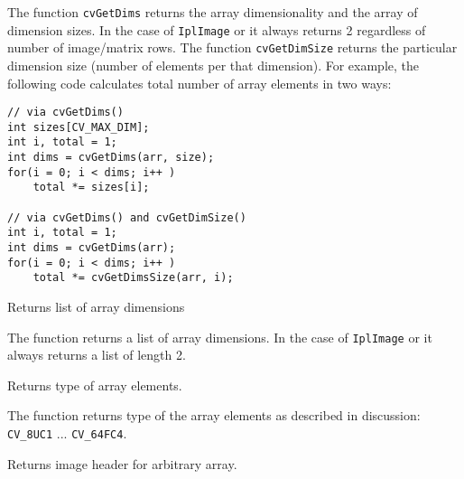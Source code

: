 The function \texttt{cvGetDims} returns the array dimensionality and the
array of dimension sizes. In the case of \texttt{IplImage} or  it always
returns 2 regardless of number of image/matrix rows. The function
\texttt{cvGetDimSize} returns the particular dimension size (number of
elements per that dimension). For example, the following code calculates
total number of array elements in two ways:

\begin{lstlisting}
// via cvGetDims()
int sizes[CV_MAX_DIM];
int i, total = 1;
int dims = cvGetDims(arr, size);
for(i = 0; i < dims; i++ )
    total *= sizes[i];

// via cvGetDims() and cvGetDimSize()
int i, total = 1;
int dims = cvGetDims(arr);
for(i = 0; i < dims; i++ )
    total *= cvGetDimsSize(arr, i);
\end{lstlisting}
\fi

\ifPy
{}
Returns list of array dimensions


\begin{description}
\end{description}

The function returns a list of array dimensions.
In the case of \texttt{IplImage} or  it always
returns a list of length 2.
\fi


Returns type of array elements.


\begin{description}
\end{description}

The function returns type of the array elements
as described in  discussion: \texttt{CV\_8UC1} ... \texttt{CV\_64FC4}.


Returns image header for arbitrary array.


\begin{description}
\ifC
{}
\fi
\end{description}

